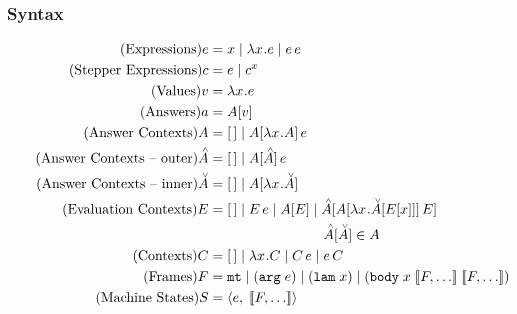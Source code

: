 \documentclass{article}
\begin{document}
\subsubsection*{Syntax}
\begin{align*}
  \tag{Expressions}
  e   &= x \mid \lambda x_{}.{e} \mid e\,e \\
  \tag{Stepper Expressions}
  c &= e \mid c^x \\
  \tag{Values}
  v &= \lambda x_{}.{e} \\
  \tag{Answers}
  a &= A[v] \\
  \tag{Answer Contexts}
  A   &= [\,] \mid A[\lambda x_{}.A]\,e \\
  \tag{Answer Contexts -- outer}
  \accentset{\wedge}{A}  &= [\,] \mid A[\accentset{\wedge}{A}]\,e \\
  \tag{Answer Contexts -- inner}
  \accentset{\vee}{A}  &= [\,] \mid A[\lambda x_{}.\accentset{\vee}{A}] \\
  \tag{Evaluation Contexts} 
  E   &= [\,] \mid E\,e \mid A[E]
  \mid \accentset{\wedge}{A}[A[\lambda x_{}.\accentset{\vee}{A}[E[x]]]\,E] \\
  & \hspace{2.9cm} \accentset{\wedge}{A}[\accentset{\vee}{A}] \in A \\
  \tag{Contexts}
  C  &= [\,] \mid \lambda x_{}.C \mid C\,e \mid e\,C \\
  \tag{Frames}
  F   &= \texttt{mt} \mid (\texttt{arg}\; e) \mid (\texttt{lam}\; x) \mid (\texttt{body}\;x\;[\![F,\ldots]\!]\;[\![F,\ldots]\!]) \\
  \tag{Machine States}
  S  &= \left\langle e,\;[\![F,\ldots]\!]\right\rangle
\end{align*}
\end{document}

